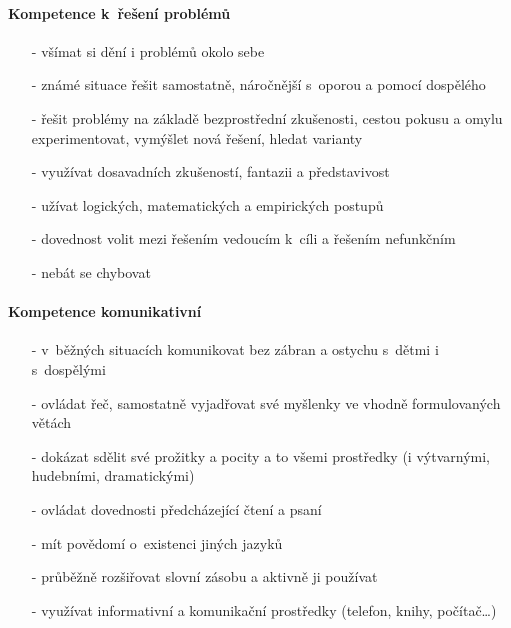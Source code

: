 				\paragraph{Kompetence k řešení problémů}
				\begin{itemize}
				\setlength\itemsep{-2mm}
				\item[-] všímat si dění i problémů okolo sebe
				\item[-] známé situace řešit samostatně, náročnější s oporou a pomocí dospělého
				\item[-] řešit problémy  na základě bezprostřední zkušenosti, cestou pokusu a omylu experimentovat, vymýšlet nová řešení, hledat varianty
				\item[-] využívat dosavadních zkušeností, fantazii a představivost 
				\item[-] užívat logických, matematických a empirických postupů 
				\item[-] dovednost volit mezi řešením vedoucím k cíli a řešením nefunkčním
				\item[-] nebát se chybovat
				\end{itemize}
				

				\paragraph{Kompetence komunikativní}
				\begin{itemize}
				\setlength\itemsep{-2mm}
				\item[-] v běžných situacích komunikovat bez zábran a ostychu s dětmi i s dospělými
				\item[-] ovládat řeč, samostatně vyjadřovat své myšlenky ve vhodně formulovaných větách
				\item[-] dokázat sdělit své prožitky a pocity a to všemi prostředky (i výtvarnými, hudebními, dramatickými) 
				\item[-] ovládat dovednosti předcházející čtení a psaní 
				\item[-] mít povědomí o~existenci jiných jazyků
				\item[-] průběžně rozšiřovat slovní zásobu a aktivně ji používat
				\item[-] využívat informativní a komunikační prostředky (telefon, knihy, počítač…)
				\end{itemize}

